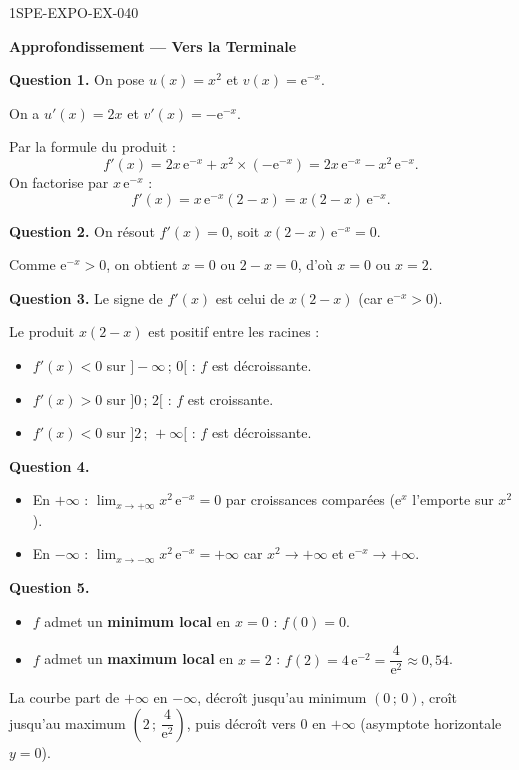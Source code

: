 \begin{corrige}{1SPE-EXPO-EX-040}
\begin{center}\textbf{Approfondissement — Vers la Terminale}\end{center}

\textbf{Question 1.} On pose $u(x) = x^2$ et $v(x) = \mathrm{e}^{-x}$.

On a $u'(x) = 2x$ et $v'(x) = -\mathrm{e}^{-x}$.

Par la formule du produit :
\[f'(x) = 2x\,\mathrm{e}^{-x} + x^2 \times (-\mathrm{e}^{-x}) = 2x\,\mathrm{e}^{-x} - x^2\,\mathrm{e}^{-x}.\]
On factorise par $x\,\mathrm{e}^{-x}$ :
\[f'(x) = x\,\mathrm{e}^{-x}(2 - x) = \boxed{x(2-x)\,\mathrm{e}^{-x}}.\]

\textbf{Question 2.} On résout $f'(x) = 0$, soit $x(2-x)\,\mathrm{e}^{-x} = 0$.

Comme $\mathrm{e}^{-x} > 0$, on obtient $x = 0$ ou $2 - x = 0$, d'où $\boxed{x = 0 \text{ ou } x = 2}$.

\textbf{Question 3.} Le signe de $f'(x)$ est celui de $x(2-x)$ (car $\mathrm{e}^{-x} > 0$).

Le produit $x(2-x)$ est positif entre les racines :
\begin{itemize}
\item $f'(x) < 0$ sur $]-\infty\,;\,0[$ : $f$ est décroissante.
\item $f'(x) > 0$ sur $]0\,;\,2[$ : $f$ est croissante.
\item $f'(x) < 0$ sur $]2\,;\,+\infty[$ : $f$ est décroissante.
\end{itemize}

\textbf{Question 4.}
\begin{itemize}
\item En $+\infty$ : $\displaystyle\lim_{x \to +\infty} x^2\,\mathrm{e}^{-x} = 0$ par croissances comparées ($\mathrm{e}^{x}$ l'emporte sur $x^2$).
\item En $-\infty$ : $\displaystyle\lim_{x \to -\infty} x^2\,\mathrm{e}^{-x} = +\infty$ car $x^2 \to +\infty$ et $\mathrm{e}^{-x} \to +\infty$.
\end{itemize}

\textbf{Question 5.}
\begin{itemize}
\item $f$ admet un \textbf{minimum local} en $x = 0$ : $f(0) = 0$.
\item $f$ admet un \textbf{maximum local} en $x = 2$ : $f(2) = 4\,\mathrm{e}^{-2} = \dfrac{4}{\mathrm{e}^2} \approx 0{,}54$.
\end{itemize}
La courbe part de $+\infty$ en $-\infty$, décroît jusqu'au minimum $(0\,;\,0)$, croît jusqu'au maximum $\left(2\,;\,\dfrac{4}{\mathrm{e}^2}\right)$, puis décroît vers $0$ en $+\infty$ (asymptote horizontale $y = 0$).
\end{corrige}
